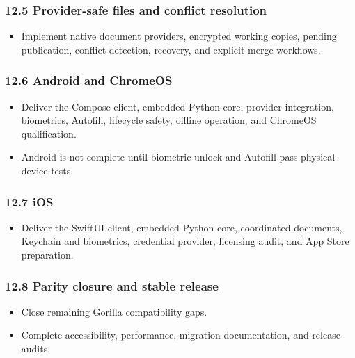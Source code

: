\documentclass[
  letterpaper,
]{article}
\providecommand{\tightlist}{%
  \setlength{\itemsep}{0pt}\setlength{\parskip}{0pt}}
\begin{document}
\subsubsection{12.5 Provider-safe files and conflict resolution}\label{125-provider-safe-files-and-conflict-resolution}

\begin{itemize}
\tightlist
\item
  Implement native document providers, encrypted working copies, pending publication, conflict detection, recovery, and
  explicit merge workflows.
\end{itemize}

\subsubsection{12.6 Android and ChromeOS}\label{126-android-and-chromeos}

\begin{itemize}
\tightlist
\item
  Deliver the Compose client, embedded Python core, provider integration, biometrics, Autofill, lifecycle safety,
  offline operation, and ChromeOS qualification.
\item
  Android is not complete until biometric unlock and Autofill pass physical-device tests.
\end{itemize}

\subsubsection{12.7 iOS}\label{127-ios}

\begin{itemize}
\tightlist
\item
  Deliver the SwiftUI client, embedded Python core, coordinated documents, Keychain and biometrics, credential provider,
  licensing audit, and App Store preparation.
\end{itemize}

\subsubsection{12.8 Parity closure and stable release}\label{128-parity-closure-and-stable-release}

\begin{itemize}
\tightlist
\item
  Close remaining Gorilla compatibility gaps.
\item
  Complete accessibility, performance, migration documentation, and release audits.
\end{itemize}
\end{document}

